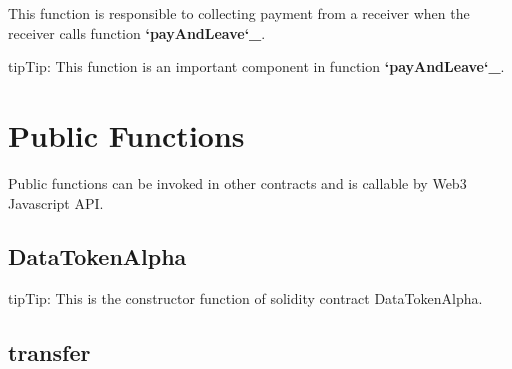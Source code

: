 \documentclass[letterpaper,10pt,english]{sphinxmanual}
\begin{document}
This function is responsible to collecting payment from a receiver when the receiver calls function {\color{red}\bfseries{}{}`payAndLeave{}`\_}.

\begin{sphinxadmonition}{tip}{Tip:}
This function is an important component in function {\color{red}\bfseries{}{}`payAndLeave{}`\_}.
\end{sphinxadmonition}


\section{Public Functions}
\label{\detokenize{PublicFunctions::doc}}\label{\detokenize{PublicFunctions:public-functions}}
Public functions can be invoked in other contracts and is callable by Web3 Javascript API.


\subsection{DataTokenAlpha}
\label{\detokenize{PublicFunctions:datatokenalpha}}
%
\begin{sphinxVerbatim}[commandchars=\\\{\},numbers=left,firstnumber=1,stepnumber=1]
   
      
    \PYG{p}{[}\PYG{p}{]}  
\end{sphinxVerbatim}

\begin{sphinxadmonition}{tip}{Tip:}
This is the constructor function of solidity contract DataTokenAlpha.
\end{sphinxadmonition}


\subsection{transfer}
\label{\detokenize{PublicFunctions:transfer}}
%
\begin{sphinxVerbatim}[commandchars=\\\{\}]
    
\end{sphinxVerbatim}
\end{document}

